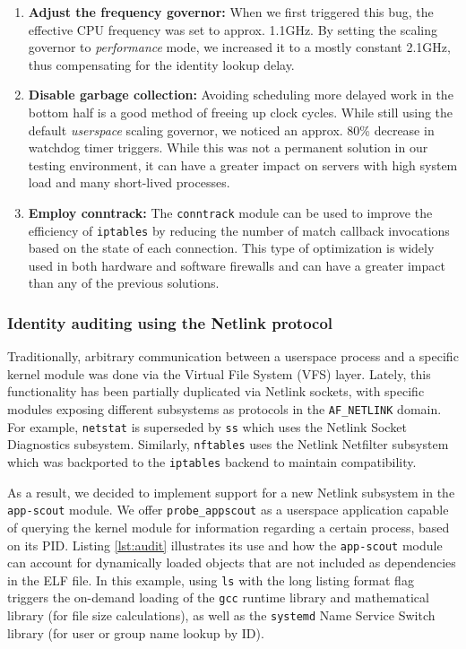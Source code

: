 \begin{enumerate}
    \item \textbf{Adjust the frequency governor:} When we first triggered this bug, the effective CPU frequency was set to approx. 1.1GHz. By setting the scaling governor to \textit{performance} mode, we increased it to a mostly constant 2.1GHz, thus compensating for the identity lookup delay.

    \item \textbf{Disable garbage collection:} Avoiding scheduling more delayed work in the bottom half is a good method of freeing up clock cycles. While still using the default \textit{userspace} scaling governor, we noticed an approx. 80\% decrease in watchdog timer triggers. While this was not a permanent solution in our testing environment, it can have a greater impact on servers with high system load and many short-lived processes.

    \item \textbf{Employ conntrack:} The \texttt{conntrack} module can be used to improve the efficiency of \texttt{iptables} by reducing the number of match callback invocations based on the state of each connection. This type of optimization is widely used in both hardware and software firewalls and can have a greater impact than any of the previous solutions.
\end{enumerate}

\subsubsection{Identity auditing using the Netlink protocol}

Traditionally, arbitrary communication between a userspace process and a specific kernel module was done via the Virtual File System (VFS) layer. Lately, this functionality has been partially duplicated via Netlink sockets, with specific modules exposing different subsystems as protocols in the \texttt{AF\_NETLINK} domain. For example, \texttt{netstat} is superseded by \texttt{ss} which uses the Netlink Socket Diagnostics subsystem. Similarly, \texttt{nftables} uses the Netlink Netfilter subsystem which was backported to the \texttt{iptables} backend to maintain compatibility.

As a result, we decided to implement support for a new Netlink subsystem in the \texttt{app-scout} module. We offer \texttt{probe\_appscout} as a userspace application capable of querying the kernel module for information regarding a certain process, based on its PID. Listing \ref{lst:audit} illustrates its use and how the \texttt{app-scout} module can account for dynamically loaded objects that are not included as dependencies in the ELF file. In this example, using \texttt{ls} with the long listing format flag triggers the on-demand loading of the \texttt{gcc} runtime library and mathematical library (for file size calculations), as well as the \texttt{systemd} Name Service Switch library (for user or group name lookup by ID).

